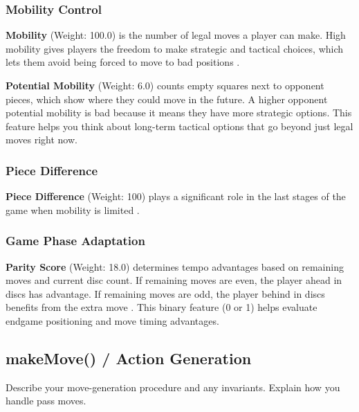 \documentclass[10pt, titlepage, oneside, a4paper]{article}
\begin{document}
\subsubsection{Mobility Control}

\vspace{0.5em}

\textbf{Mobility} (Weight: 100.0) is the number of legal moves a player can make.  High mobility gives players the freedom to make strategic and tactical choices, which lets them avoid being forced to move to bad positions \cite{cohen2020learning}.

\textbf{Potential Mobility} (Weight: 6.0) counts empty squares next to opponent pieces, which show where they could move in the future.  A higher opponent potential mobility is bad because it means they have more strategic options\cite{buro1995othello}.  This feature helps you think about long-term tactical options that go beyond just legal moves right now.

\subsubsection{Piece Difference}

\vspace{0.5em}

\textbf{Piece Difference} (Weight: 100) plays a significant role in the last stages of the game when mobility is limited \cite{othello-heuristics-analysis}.

\subsubsection{Game Phase Adaptation}

\vspace{0.5em}
\textbf{Parity Score} (Weight: 18.0) determines tempo advantages based on remaining moves and current disc count. If remaining moves are even, the player ahead in discs has advantage. If remaining moves are odd, the player behind in discs benefits from the extra move \cite{brianothello2005}. This binary feature (0 or 1) helps evaluate endgame positioning and move timing advantages.

\subsection{makeMove() / Action Generation}
Describe your move-generation procedure and any invariants. Explain how you handle pass moves.
\end{document}
